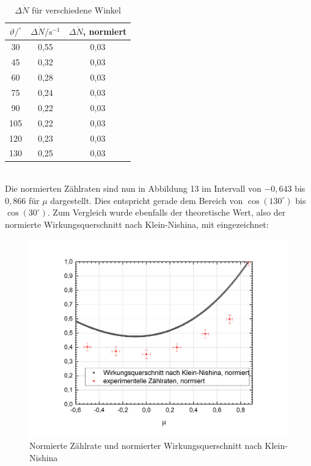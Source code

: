 \documentclass[german,  %
parskip=full,  %
]{scrartcl}
\begin{document}
\begin{table}[h!]\centering
\begin{tabular}{|c|c|c|}\hline
$\vartheta/^{\circ}$ & $\Delta \dot{N}/\text{s}^{-1}$ &  $\Delta \dot{N}$, normiert \\\hline
30   &  0,55 &0,03		\\\hline
45   & 0,32&	0,03	\\\hline
60   &  0,28&0,03	\\\hline
75   &  0,24&0,03	\\\hline
90   & 0,22&0,03	\\\hline
105 & 0,22& 0,03	\\\hline
120 &  0,23&0,03		\\\hline
130 &  0,25&0,03		\\\hline
\end{tabular}
\caption{$\Delta \dot{N}$ für verschiedene Winkel}
\end{table}
\\
Die normierten Zählraten sind nun in Abbildung 13 im Intervall von $-0,643$ bis $0,866$ für $\mu$ dargestellt. Dies entspricht gerade dem Bereich von $\cos(130^{\circ})$ bis $\cos(30^{\circ})$. Zum Vergleich wurde ebenfalls der theoretische Wert, also der normierte Wirkungsquerschnitt nach Klein-Nishina, mit eingezeichnet:
\\
\begin{figure}[h!]\centering
\includegraphics[scale=0.5]{wirkungsquerschnitt}
\caption{Normierte Zählrate und normierter Wirkungsquerschnitt nach Klein-Nishina}
\end{figure}
\\
\end{document}
